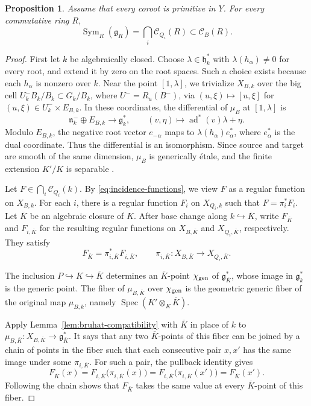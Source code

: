 \documentclass[twoside,a4paper,12pt,reqno]{amsart}
\newtheorem{proposition}[theorem]{Proposition}
\theoremstyle{remark}
\numberwithin{equation}{section}
\newcommand{\fg}{\mathfrak g}
\newcommand{\fh}{\mathfrak h}
\newcommand{\fn}{\mathfrak n}
\DeclareMathOperator{\Sym}{Sym}
\DeclareMathOperator{\Spec}{Spec}
\begin{document}
\begin{proposition}\label{prop:classical-reconstruction}
Assume that every coroot is primitive in \(Y\). For every commutative ring \(R\),
\[
\Sym_R(\fg_R)=\bigcap_i\mathcal C_{Q_i}(R)
\subset\mathcal C_B(R).
\]
\end{proposition}
\begin{proof}
First let \(k\) be algebraically closed.
Choose \(\lambda\in\fh_k^*\) with
\(\lambda(h_\alpha)\ne0\) for every root, and extend it by zero on
the root spaces. Such a choice exists because 
each \(h_\alpha\) is nonzero over \(k\).
Near the point \([1,\lambda]\), we trivialize \(X_{B,k}\) over the
big cell \(U_k^-B_k/B_k\subset G_k/B_k\), where \(U^-=R_u(B^-)\),
via \((u,\xi)\mapsto[u,\xi]\) for \((u,\xi)\in U_k^-\times E_{B,k}\).
In these coordinates, the differential of \(\mu_B\) at \([1,\lambda]\) is
\[
\fn_k^-\oplus E_{B,k}\longrightarrow\fg_k^*,\qquad
(v,\eta)\longmapsto\operatorname{ad}^*(v)\lambda+\eta.
\]
Modulo \(E_{B,k}\), the negative root vector \(e_{-\alpha}\)
maps to \(\lambda(h_\alpha)e_\alpha^*\), where \(e_\alpha^*\) is
the dual coordinate. Thus the differential is an isomorphism.
Since source and target are smooth of the same dimension,
\(\mu_B\) is generically \'{e}tale, and the finite extension
\(K'/K\) is separable \cite[Tags 02GH and 02NV]{Stacks}.

Let \(F\in\bigcap_i\mathcal C_{Q_i}(k)\). By
\eqref{eq:incidence-functions}, we view \(F\) as a regular function
on \(X_{B,k}\). For each \(i\), there is a regular function \(F_i\)
on \(X_{Q_i,k}\) such that \(F=\pi_i^*F_i\).
Let \(\overline K\) be an algebraic closure of \(K\).
After base change along \(k\hookrightarrow\overline K\), write
\(F_{\overline K}\) and \(F_{i,\overline K}\) for the resulting
regular functions on \(X_{B,\overline K}\) and
\(X_{Q_i,\overline K}\), respectively. They satisfy
\[
F_{\overline K}=\pi_{i,\overline K}^*F_{i,\overline K},
\qquad
\pi_{i,\overline K}:X_{B,\overline K}\longrightarrow X_{Q_i,\overline K}.
\]

The inclusion \(P\hookrightarrow K\hookrightarrow\overline K\)
determines an \(\overline K\)-point \(\chi_{\rm gen}\) of
\(\fg_{\overline K}^*\), whose image in \(\fg_k^*\) is the generic point.
The fiber of \(\mu_{B,\overline K}\) over \(\chi_{\rm gen}\) is
the geometric generic fiber of the original map \(\mu_{B,k}\),
namely \(\Spec(K'\otimes_K\overline K)\).

Apply Lemma~\ref{lem:bruhat-compatibility} with \(\overline K\) in place
of \(k\) to \(\mu_{B,\overline K}:X_{B,\overline K}\to\fg_{\overline K}^*\).
It says that any two \(\overline K\)-points of this fiber can be
joined by a chain of points in the fiber such that each consecutive
pair \(x,x'\) has the same image under some \(\pi_{i,\overline K}\).
For such a pair, the pullback identity gives
\[
F_{\overline K}(x)
=F_{i,\overline K}\bigl(\pi_{i,\overline K}(x)\bigr)
=F_{i,\overline K}\bigl(\pi_{i,\overline K}(x')\bigr)
=F_{\overline K}(x').
\]
Following the chain shows that \(F_{\overline K}\) takes the same
value at every \(\overline K\)-point of this fiber.


\end{proof}
\end{document}
